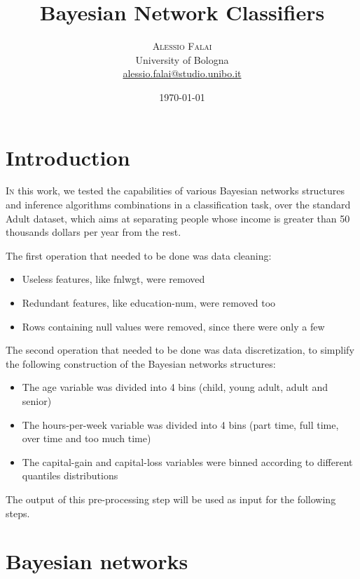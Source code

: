 \documentclass[twoside,twocolumn]{article}
\title{Bayesian Network Classifiers} %
\author{%
\textsc{Alessio Falai} \\[1ex] %
\normalsize University of Bologna \\ %
\normalsize \href{mailto:alessio.falai@studio.unibo.it}{alessio.falai@studio.unibo.it} %
}
\date{\today} %
\begin{document}
\maketitle


\section{Introduction}

\lettrine[nindent=0em,lines=3]{I}n this work, we tested the capabilities of various Bayesian networks structures and inference algorithms combinations in a
classification task, over the standard Adult dataset, which aims at separating people whose income is greater than 50 thousands dollars per year from the rest.

The first operation that needed to be done was data cleaning: 
\begin{itemize}
  \item Useless features, like fnlwgt, were removed
  \item Redundant features, like education-num, were removed too
  \item Rows containing null values were removed, since there were only a few
\end{itemize}

The second operation that needed to be done was data discretization, to simplify the following construction of the Bayesian networks structures:
\begin{itemize}
  \item The age variable was divided into 4 bins (child, young adult, adult and senior)
  \item The hours-per-week variable was divided into 4 bins (part time, full time, over time and too much time)
  \item The capital-gain and capital-loss variables were binned according to different quantiles distributions
\end{itemize}

The output of this pre-processing step will be used as input for the following steps. 


\section{Bayesian networks}
\end{document}
